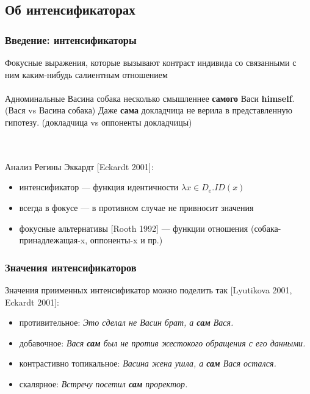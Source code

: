 \documentclass{beamer}
\begin{document}
\subsection{Об интенсификаторах}
        \begin{frame}
            \frametitle{Введение: интенсификаторы}
            
            Фокусные выражения, которые вызывают контраст индивида со связанными с ним каким-нибудь салиентным отношением\\~\\
            
            Адноминальные
            \pex
            \a Васина собака несколько смышленнее \textbf{самого} Васи \textbf{himself}. (Вася vs Васина собака)
            \a Даже \textbf{сама} докладчица не верила в представленную гипотезу. (докладчица vs оппоненты докладчицы)
            \xe
            
            
            \pause
            
            ~\\~\\Анализ Регины Эккардт [Eckardt 2001]:
            
            \begin{itemize}
                \item интенсификатор --- функция идентичности $\lambda x \in D_e. ID(x)$
                \item всегда в фокусе — в противном случае не привносит значения
                \item фокусные альтернативы [Rooth 1992] — функции отношения (собака-принадлежащая-x, оппоненты-x и пр.)
            \end{itemize}

            
        \end{frame}

        \begin{frame}
    \frametitle{Значения интенсификаторов}
    
    Значения приименных интенсификатор можно поделить так [Lyutikova 2001, Eckardt 2001]:
    
    \begin{itemize}
        \item противительное: \textit{Это сделал не Васин брат, а \textbf{сам} Вася.}
        \item добавочное: \textit{Вася \textbf{сам} был не против жестокого обращения с его данными.}
        \item контрастивно топикальное: \textit{Васина жена ушла, а \textbf{сам} Вася остался.}
        \item скалярное: \textit{Встречу посетил \textbf{сам} проректор.}
    \end{itemize}
    
\end{frame}
\end{document}
